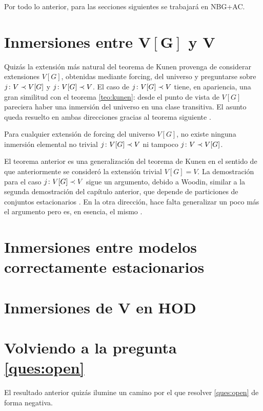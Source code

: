Por todo lo anterior, para las secciones siguientes se trabajará en NBG+AC.

\section{Inmersiones entre $\symbf{V[G]}$ y $\symbf{V}$}

Quizás la extensión más natural del teorema de Kunen provenga de considerar
extensiones $V[G]$, obtenidas mediante forcing, del universo y preguntarse sobre
$j\colon V\prec V[G]$ y $j\colon V[G]\prec V$.
El caso de $j\colon V[G]\prec V$ tiene, en apariencia, una gran similitud con
el teorema \ref{teo:kunen}: desde el punto de vista de $V[G]$ pareciera
haber una inmersión del universo en una clase transitiva.
El asunto queda resuelto en ambas direcciones gracias al teorema siguiente
\autocite[Teoremas 5 y 7]{hamkins_generalizations_2012}.

\begin{teo}\label{teo:kunen-forcing}
    Para cualquier extensión de forcing del universo $V[G]$,
    no existe ninguna inmersión elemental no trivial $j\colon V[G]\prec V$
    ni tampoco $j\colon V\prec V[G]$.
\end{teo}

El teorema anterior es una generalización del teorema de Kunen
en el sentido de que anteriormente se consideró la extensión trivial $V[G]=V$.
La demostración para el caso $j\colon V[G]\prec V$ sigue un argumento,
debido a Woodin, similar a la segunda demostración del capítulo anterior,
que depende de particiones de conjuntos estacionarios \autocite[1876]{hamkins_generalizations_2012}.
En la otra dirección, hace falta generalizar un poco más el argumento pero es, en esencia,
el mismo \autocite[1877]{hamkins_generalizations_2012}.

\section{Inmersiones entre modelos correctamente estacionarios}

\section{Inmersiones de $\symbf{V}$ en HOD}

\section{Volviendo a la pregunta \ref{ques:open}}

El resultado anterior quizás ilumine un camino por el que resolver \ref{ques:open}
de forma negativa.

\fi
\backmatter
\ifreferencias
\singlespacing
{}
\printbibliography[heading=mybib]
\fi

